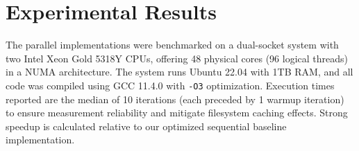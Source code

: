 \documentclass[10pt]{article}
\newcommand{\code}[1]{\texttt{#1}}
\begin{document}






\section{Experimental Results} \label{sec:results}
The parallel implementations were benchmarked on a dual-socket system with two Intel Xeon Gold 5318Y CPUs, offering 48 physical cores (96 logical threads) in a NUMA architecture. The system runs Ubuntu 22.04 with 1TB RAM, and all code was compiled using GCC 11.4.0 with \code{-O3} optimization. Execution times reported are the median of 10 iterations (each preceded by 1 warmup iteration) to ensure measurement reliability and mitigate filesystem caching effects. Strong speedup is calculated relative to our optimized sequential baseline implementation.
\end{document}
